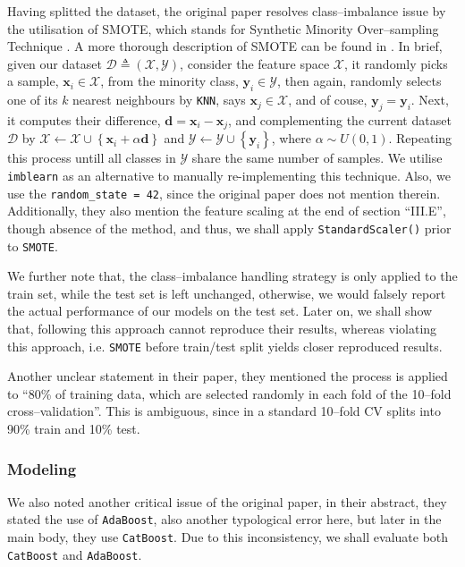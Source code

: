 Having splitted the dataset, the original paper resolves class–imbalance issue by the utilisation of SMOTE, which stands for Synthetic Minority Over–sampling Technique \cite{SMOTE}.
A more thorough description of SMOTE can be found in \cite{SMOTE}. In brief, given our dataset $\mathcal D \triangleq (\mathcal X, \mathcal Y)$, consider the feature space $\mathcal X$, it randomly picks a sample, $\mathbf x_i \in \mathcal X$, from the minority class, $\mathbf y_i \in \mathcal Y$, then again, randomly selects one of its $k$ nearest neighbours by \texttt{KNN}, says $\mathbf x_j \in \mathcal X$, and of couse, $\mathbf y_j = \mathbf y_i$.
Next, it computes their difference, $\mathbf d = \mathbf x_i - \mathbf x_j$, and complementing the current dataset $\mathcal D$ by $\mathcal X \leftarrow \mathcal X \cup \left\{ \mathbf x_i + \alpha \mathbf d \right\}$ and $\mathcal Y \leftarrow \mathcal Y \cup \left\{ \mathbf y_i \right\}$, where $\alpha \sim U(0, 1)$.
Repeating this process untill all classes in $\mathcal Y$ share the same number of samples. We utilise \texttt{imblearn} as an alternative to manually re-implementing this technique.
Also, we use the \texttt{random\_state = 42}, since the original paper does not mention therein.
Additionally, they also mention the feature scaling at the end of section ``III.E'', though absence of the method, and thus, we shall apply \texttt{StandardScaler()} prior to \texttt{SMOTE}.

We further note that, the class–imbalance handling strategy is only applied to the train set, while the test set is left unchanged, otherwise, we would falsely report the actual performance of our models on the test set.
Later on, we shall show that, following this approach cannot reproduce their results, whereas violating this approach, i.e. \texttt{SMOTE} before train/test split yields closer reproduced results.

Another unclear statement in their paper, they mentioned the process is applied to ``80\% of training data, which are selected randomly in each fold of the 10–fold cross–validation''.
This is ambiguous, since in a standard 10–fold CV splits into 90\% train and 10\% test.



\subsubsection{Modeling}

We also noted another critical issue of the original paper, in their abstract, they stated the use of \texttt{AdaBoost}, also another typological error here, but later in the main body, they use \texttt{CatBoost}.
Due to this inconsistency, we shall evaluate both \texttt{CatBoost} and \texttt{AdaBoost}.

